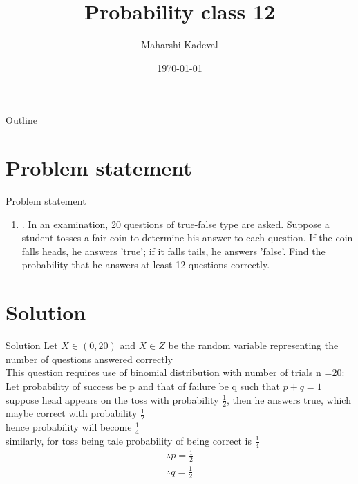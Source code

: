 \documentclass{beamer}
\title{Probability class 12}
\author{Maharshi Kadeval}
\date{\today}
\providecommand{\brak}[1]{\ensuremath{\left(#1\right)}}
\begin{document}
\begin{frame}
    \titlepage 
\end{frame}

\logo{}


\begin{frame}{Outline}
    \tableofcontents
\end{frame}


\section{Problem statement}
\begin{frame}{Problem statement}
\begin{enumerate}
\item . In an examination, 20 questions of true-false type are asked. Suppose a student
tosses a fair coin to determine his answer to each question. If the coin falls
heads, he answers 'true'; if it falls tails, he answers 'false'. Find the probability
that he answers at least 12 questions correctly.\\
\end{enumerate}

\end{frame}


\section{Solution}
\begin{frame}{Solution}
Let $X \in \brak{0,20}$ and $X \in Z$ be the random variable representing the number of questions answered correctly\\
This question requires use of binomial distribution with number of trials n =20:\\
Let probability of success be p and that of failure be q such that $p+q = 1$\\

suppose head appears on the toss with probability $\frac{1}{2}$, then he answers true, which maybe correct with probability $\frac{1}{2}$ \\
hence probability will become $\frac{1}{4}$\\
similarly, for toss being tale probability of being correct is $\frac{1}{4}$
\begin{align}
\therefore p = \frac{1}{2}\\
\therefore q = \frac{1}{2}
\end{align}

\end{frame}
\end{document}
